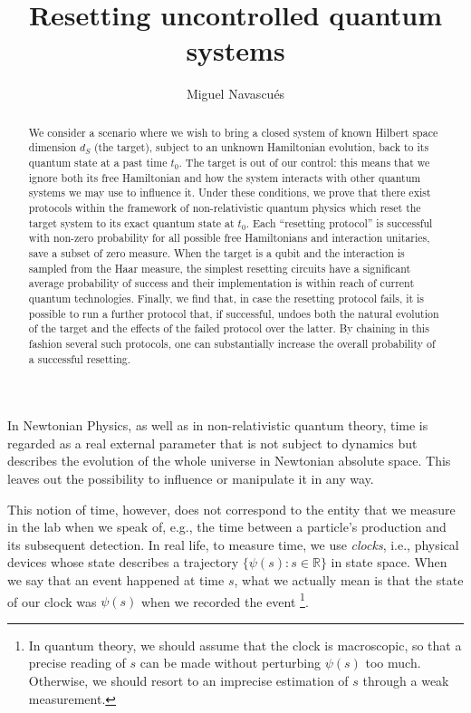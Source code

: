 \documentclass[twocolumn,prx,aps,longbibliography]{revtex4-1}
\def\R{\mathbb{R}}
\begin{document}
\title{Resetting uncontrolled quantum systems}
\author{Miguel Navascu\'es}


\begin{abstract}
We consider a scenario where we wish to bring a closed system of known Hilbert space dimension $d_S$ (the target), subject to an unknown Hamiltonian evolution, back to its quantum state at a past time $t_0$. The target is out of our control: this means that we ignore both its free Hamiltonian and how the system interacts with other quantum systems we may use to influence it. Under these conditions, we prove that there exist protocols within the framework of non-relativistic quantum physics which reset the target system to its exact quantum state at $t_0$. Each ``resetting protocol'' is successful with non-zero probability for all possible free Hamiltonians and interaction unitaries, save a subset of zero measure. When the  target is a qubit and the interaction is sampled from the Haar measure, the simplest resetting circuits have a significant average probability of success and their implementation is within reach of current quantum technologies. Finally, we find that, in case the resetting protocol fails, it is possible to run a further protocol that, if successful, undoes both the natural evolution of the target and the effects of the failed protocol over the latter. By chaining in this fashion several such protocols, one can substantially increase the overall probability of a successful resetting.
\end{abstract}


\maketitle


In Newtonian Physics, as well as in non-relativistic quantum theory, time is regarded as a real external parameter that is not subject to dynamics but describes the evolution of the whole universe in Newtonian absolute space. This leaves out the possibility to influence or manipulate it in any way. 

This notion of time, however, does not correspond to the entity that we measure in the lab when we speak of, e.g., the time between a particle's production and its subsequent detection. In real life, to measure time, we use \emph{clocks}, i.e., physical devices whose state describes a trajectory $\{\psi(s):s\in\R\}$ in state space. When we say that an event happened at time $s$, what we actually mean is that the state of our clock was $\psi(s)$ when we recorded the event \footnote{In quantum theory, we should assume that the clock is macroscopic, so that a precise reading of $s$ can be made without perturbing $\psi(s)$ too much. Otherwise, we should resort to an imprecise estimation of $s$ through a weak measurement.}. 
\end{document}
